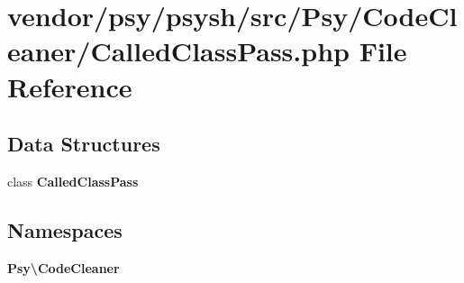 \section{vendor/psy/psysh/src/\+Psy/\+Code\+Cleaner/\+Called\+Class\+Pass.php File Reference}
\label{_called_class_pass_8php}
\subsection*{Data Structures}
\begin{DoxyCompactItemize}
\item 
class {\bf Called\+Class\+Pass}
\end{DoxyCompactItemize}
\subsection*{Namespaces}
\begin{DoxyCompactItemize}
\item 
 {\bf Psy\textbackslash{}\+Code\+Cleaner}
\end{DoxyCompactItemize}
